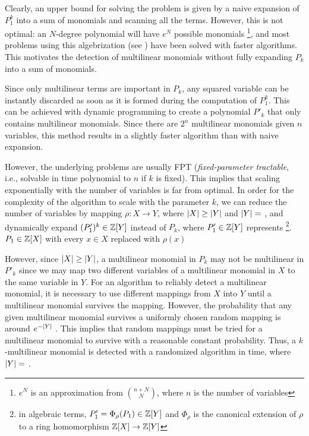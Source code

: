 Clearly, an upper bound for solving the problem is given by a 
naive expansion of $P_1^k$ into a sum of monomials and scanning all the terms. 
However, this is not optimal: an $N$-degree polynomial will have $e^N$ 
possible monomials
\footnote{$e^N$ is an approximation from $\binom{n+N}{N}$, where $n$ is the number of variables}, 
and most problems using this algebrization 
(see ) 
have been solved with faster algorithms. 
This motivates the detection of multilinear monomials 
without fully expanding $P_k$ into a sum of monomials.

Since only multilinear terms are important in $P_k$, 
any squared variable can be instantly discarded as 
soon as it is formed 
during the computation of $P_1^k$. 
This can be achieved with dynamic programming 
to create a polynomial $P'_k$ that 
only contains multilinear monomials. 
Since there are $2^n$ multilinear monomials given $n$ variables, 
this method results in a slightly 
faster algorithm than with naive expansion.

However, the underlying problems are usually FPT 
(\emph{fixed-parameter tractable}, i.e., 
solvable in time polynomial to $n$ if $k$ is fixed). 
This implies that scaling exponentially 
with the number of variables is far from optimal. 
In order for the complexity of the algorithm to scale 
with the parameter $k$, we can reduce the number of variables 
by mapping $\rho \colon X \to Y$, where 
${\left\vert X\right\vert} \geq {\left\vert Y\right\vert}$ and ${\left\vert Y\right\vert} =$ , 
and dynamically expand $(P'_1)^k \in \mathbb Z[Y]$ instead of
$P_k$, where $P'_1 \in \mathbb Z[Y]$ represents
\footnote{in algebraic terms, $P_1' = \Phi_\rho(P_1) \in \mathbb Z[Y]$ and $\Phi_\rho$ is
the canonical extension of $\rho$ to a ring homomorphism $\mathbb Z[X] \to \mathbb Z[Y]$}. 
$P_1 \in \mathbb Z[X]$ with every $x \in X$ replaced with $\rho(x)$

However, since ${\left\vert X\right\vert} \geq {\left\vert Y\right\vert}$, 
a multilinear monomial in $P_k$ may not be multilinear in $P'_k$ since 
we may map two different variables of a multilinear monomial in $X$ 
to the same variable in $Y$. 
For an algorithm to reliably detect a multilinear monomial, 
it is necessary to use different mappings 
from $X$ into $Y$ until a multilinear monomial survives the mapping. 
However, the probability that any given 
multilinear monomial survives a uniformly chosen random mapping
is around $e^{-{\left\vert Y\right\vert}}$ \cite{KouWil15}. 
This implies that 
 random mappings must be tried for a 
multilinear monomial to survive with a reasonable constant probability. Thus, a 
$k$-multilinear monomial is detected with a 
randomized algorithm in  time, where ${\left\vert Y\right\vert} =$ .

